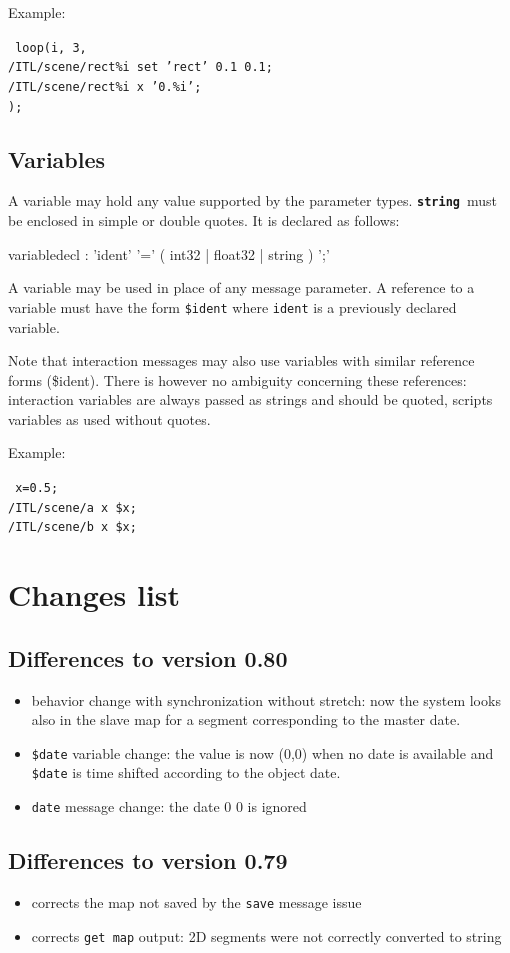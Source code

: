 \documentclass[a4paper,twoside]{report}
\newcommand{\toplevel}[1]	{\chapter{#1}}
\newcommand{\sublevel}[1]	{\section{#1}}
\newcommand{\OSC}[1]		{\texttt{#1}}
\newcommand{\osctype}[1]{\textbf{\texttt{{\small #1}}}}
\newcommand{\oscstring}{\osctype{string}}
\newcommand{\sample}	[1]			{\begin{center}\colorbox{mygrey}{
								\begin{minipage}[t]{0.9\columnwidth} 
								{\small \texttt{#1}}
								\end{minipage}}\end{center}}
\newcommand{\samplev}[1]			{\begin{center}\colorbox{mygrey}{
								\begin{minipage}[t]{\columnwidth} 
								{\small \texttt{#1}}
								\end{minipage}}\end{center}}
\begin{document}
Example:
\samplev{
loop(i, 3,\\
   /ITL/scene/rect\%i set 'rect' 0.1 0.1; \\
   /ITL/scene/rect\%i x '0.\%i'; \\
 );
}

\sublevel{Variables}\label{scriptvar}

A variable may hold any value supported by the parameter types. \oscstring\ must be enclosed in simple or double quotes. It is declared as follows:
\begin{rail} 
variabledecl : 'ident' '=' ( int32 | float32 | string ) ';'
\end{rail}
A variable may be used in place of any message parameter. A reference to a variable must have the form \OSC{\$ident} where \OSC{ident} is a previously declared variable. 

Note that interaction messages may also use variables with similar reference forms (\$ident). There is however no ambiguity concerning these references: interaction variables are always passed as strings and should be quoted, scripts variables as used without quotes.

Example:
\sample{
x=0.5;\\
/ITL/scene/a x \$x;\\
/ITL/scene/b x \$x;
}

\toplevel{ Changes list}

\sublevel{Differences to version 0.80}
\begin{itemize}
\item behavior change with synchronization without stretch: now the system looks also in the
  slave map for a segment corresponding to the master date.
\item \OSC{\$date} variable change: the value is now (0,0) when no date is available and \OSC{\$date} is time shifted according to the object date.
\item \OSC{date} message change: the date 0 0 is ignored
\end{itemize}


\sublevel{Differences to version 0.79}
\begin{itemize}
\item corrects the map not saved by the \OSC{save} message issue
\item corrects \OSC{get map} output: 2D segments were not correctly converted to string
\end{itemize}
\end{document}
